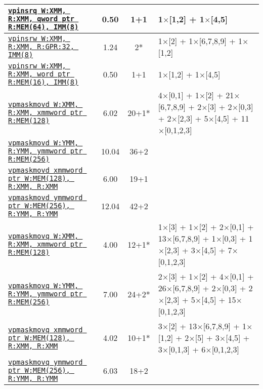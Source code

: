\documentclass[a4paper,english,fontsize=9]{scrartcl}
\begin{document}
\begin{longtable}{p{}ccL{.25\textwidth}}
  \midrule
  \texttt{\href{https://felixcloutier.com/x86/PINSRB:PINSRD:PINSRQ.html}{vpinsrq W:XMM, R:XMM, qword ptr R:MEM(64), IMM(8)}} & 0.50 & 1+1 & 1\(\times\)[1,2] + 1\(\times\)[4,5] \\
  \midrule
  \texttt{\href{https://felixcloutier.com/x86/PINSRW.html}{vpinsrw W:XMM, R:XMM, R:GPR:32, IMM(8)}} & 1.24 & 2* & 1\(\times\)[2] + 1\(\times\)[6,7,8,9] + 1\(\times\)[1,2] \\
  \midrule
  \texttt{\href{https://felixcloutier.com/x86/PINSRW.html}{vpinsrw W:XMM, R:XMM, word ptr R:MEM(16), IMM(8)}} & 0.50 & 1+1 & 1\(\times\)[1,2] + 1\(\times\)[4,5] \\
  \midrule
  \texttt{\href{https://felixcloutier.com/x86/VPMASKMOV.html}{vpmaskmovd W:XMM, R:XMM, xmmword ptr R:MEM(128)}} & 6.02 & 20+1* & 4\(\times\)[0,1] + 1\(\times\)[2] + 21\(\times\)[6,7,8,9] + 2\(\times\)[3] + 2\(\times\)[0,3] + 2\(\times\)[2,3] + 5\(\times\)[4,5] + 11\(\times\)[0,1,2,3] \\
  \midrule
  \texttt{\href{https://felixcloutier.com/x86/VPMASKMOV.html}{vpmaskmovd W:YMM, R:YMM, ymmword ptr R:MEM(256)}} & 10.04 & 36+2 &  \\
  \midrule
  \texttt{\href{https://felixcloutier.com/x86/VPMASKMOV.html}{vpmaskmovd xmmword ptr W:MEM(128), R:XMM, R:XMM}} & 6.00 & 19+1 &  \\
  \midrule
  \texttt{\href{https://felixcloutier.com/x86/VPMASKMOV.html}{vpmaskmovd ymmword ptr W:MEM(256), R:YMM, R:YMM}} & 12.04 & 42+2 &  \\
  \midrule
  \texttt{\href{https://felixcloutier.com/x86/VPMASKMOV.html}{vpmaskmovq W:XMM, R:XMM, xmmword ptr R:MEM(128)}} & 4.00 & 12+1* & 1\(\times\)[3] + 1\(\times\)[2] + 2\(\times\)[0,1] + 13\(\times\)[6,7,8,9] + 1\(\times\)[0,3] + 1\(\times\)[2,3] + 3\(\times\)[4,5] + 7\(\times\)[0,1,2,3] \\
  \midrule
  \texttt{\href{https://felixcloutier.com/x86/VPMASKMOV.html}{vpmaskmovq W:YMM, R:YMM, ymmword ptr R:MEM(256)}} & 7.00 & 24+2* & 2\(\times\)[3] + 1\(\times\)[2] + 4\(\times\)[0,1] + 26\(\times\)[6,7,8,9] + 2\(\times\)[0,3] + 2\(\times\)[2,3] + 5\(\times\)[4,5] + 15\(\times\)[0,1,2,3] \\
  \midrule
  \texttt{\href{https://felixcloutier.com/x86/VPMASKMOV.html}{vpmaskmovq xmmword ptr W:MEM(128), R:XMM, R:XMM}} & 4.02 & 10+1* & 3\(\times\)[2] + 13\(\times\)[6,7,8,9] + 1\(\times\)[1,2] + 2\(\times\)[5] + 3\(\times\)[4,5] + 3\(\times\)[0,1,3] + 6\(\times\)[0,1,2,3] \\
  \midrule
  \texttt{\href{https://felixcloutier.com/x86/VPMASKMOV.html}{vpmaskmovq ymmword ptr W:MEM(256), R:YMM, R:YMM}} & 6.03 & 18+2 &  \\

\end{longtable}
\end{document}
